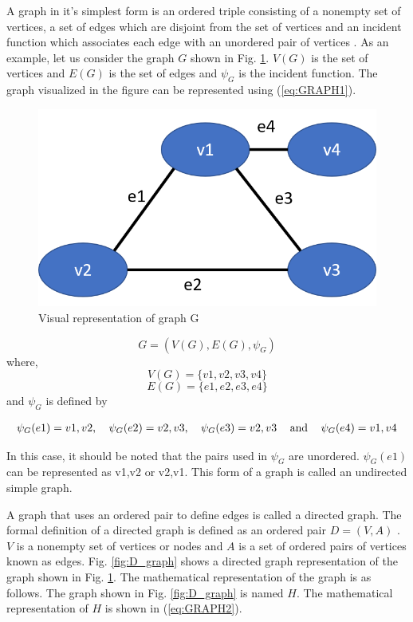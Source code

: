 A graph in it's simplest form is an ordered triple consisting of a nonempty set of vertices, a set of edges which are disjoint from the set of vertices and an incident function which associates each edge with an unordered pair of vertices \cite{bondy1976graph}. As an example, let us consider the graph $G$ shown in Fig. \ref{fig:Simple_graph}. $V(G)$ is the set of vertices and $E(G)$ is the set of edges and $\psi_G$ is the incident function. The graph visualized in the figure can be represented using (\ref{eq:GRAPH1}).\\

\begin{figure}[!htb]
\centering
\includegraphics[width=0.5\linewidth]{figs/A8/Simple_graph.png}
\caption{Visual representation of graph G}
\label{fig:Simple_graph}
\vspace{-3mm}
\end{figure}

\begin{equation}
\label{eq:GRAPH1}
   G = (V(G), E(G), \psi_G)
\end{equation}
where,
$$
V(G) = \{v1,v2,v3,v4\} 
$$
$$
E(G) = \{e1, e2, e3, e4\}
$$
and $\psi_G$ is defined by 

\begin{equation*}
\begin{tabular}{lllll}
$\psi_G(e1) = v1,v2$, &$\psi_G(e2) = v2,v3$,  &$\psi_G(e3) = v2,v3$ & and & $\psi_G(e4) = v1,v4$
\end{tabular}
\end{equation*}

In this case, it should be noted that the pairs used in $\psi_G$ are unordered. $\psi_G(e1)$ can be represented as v1,v2 or v2,v1. This form of a graph is called an undirected simple graph. 

A graph that uses an ordered pair to define edges is called a directed graph. The formal definition of a directed graph is defined as an ordered pair $D = (V,A)$ \cite{bang2008digraphs}. $V$ is a nonempty set of vertices or nodes and $A$ is a set of ordered pairs of vertices known as edges. Fig. \ref{fig:D_graph} shows a directed graph representation of the graph shown in Fig. \ref{fig:Simple_graph}. The mathematical representation of the graph is as follows. The graph shown in Fig. \ref{fig:D_graph} is named $H$. The mathematical representation of $H$ is shown in (\ref{eq:GRAPH2}).

